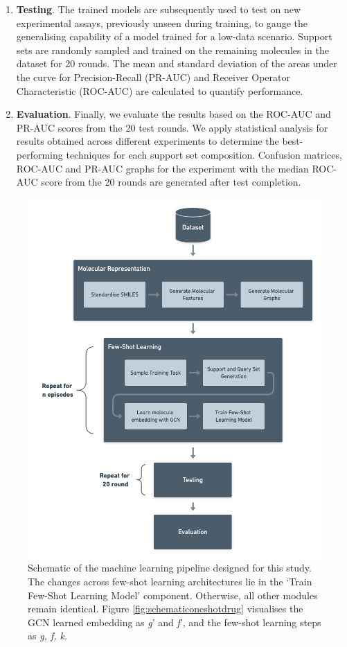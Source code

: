 \begin{enumerate}
    \item \textbf{Testing}. The trained models are subsequently used to test on new experimental assays, previously unseen during training, to gauge the generalising capability of a model trained for a low-data scenario. Support sets are randomly sampled and trained on the remaining molecules in the dataset for 20 rounds. The mean and standard deviation of the areas under the curve for Precision-Recall (PR-AUC) and Receiver Operator Characteristic (ROC-AUC) are calculated to quantify performance.

    \item \textbf{Evaluation}. Finally, we evaluate the results based on the ROC-AUC and PR-AUC scores from the 20 test rounds. We apply statistical analysis for results obtained across different experiments to determine the best-performing techniques for each support set composition. Confusion matrices, ROC-AUC and PR-AUC graphs for the experiment with the median ROC-AUC score from the 20 rounds are generated after test completion.
\end{enumerate}

\begin{figure}[!ht]
    \centering
    \includegraphics[width=0.9\linewidth]{img/architecture-schematic.png}
    \caption[Schematic of the major parts in our architecture]{Schematic of the machine learning pipeline designed for this study. The changes across few-shot learning architectures lie in the `Train Few-Shot Learning Model' component. Otherwise, all other modules remain identical. Figure \ref{fig:schematiconeshotdrug} visualises the GCN learned embedding as \textit{g}' and \textit{f}', and the few-shot learning steps as \textit{g, f, k}.}
    \label{fig:architecture-schematic}
\end{figure}

